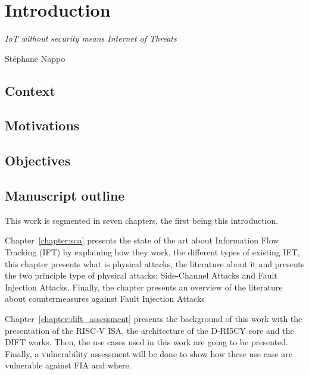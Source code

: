 \chapter{Introduction}
\label{chapter:introduction}

\epigraph{\textit{IoT without security means Internet of Threats}}{Stéphane Nappo}

\minitoc

\section{Context}

\section{Motivations}

\cite{rayvlite_wired, rayvlite_fraktal}

\section{Objectives}

\section{Manuscript outline}

This work is segmented in seven chapters, the first being this introduction.

Chapter~\ref{chapter:soa} presents the state of the art about Information Flow Tracking (IFT) by explaining how they work, the different types of existing IFT, this chapter presents what is physical attacks, the literature about it and presents the two principle type of physical attacks: Side-Channel Attacks and Fault Injection Attacks. Finally, the chapter presents an overview of the literature about countermeasures against Fault Injection Attacks

Chapter~\ref{chapter:dift_assessment} presents the background of this work with the presentation of the RISC-V ISA, the architecture of the D-RI5CY core and the DIFT works. Then, the use cases used in this work are going to be presented. Finally, a vulnerability assessment will be done to show how these use case are vulnerable against FIA and where.

